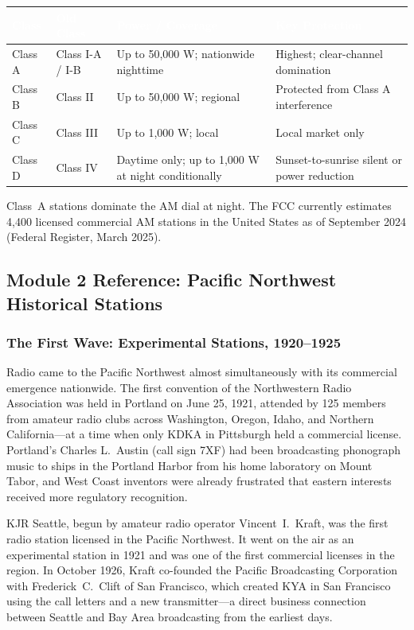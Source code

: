 \documentclass[11pt,letterpaper]{article}
\newcommand{\tableheader}[1]{\textbf{\sffamily\textcolor{white}{#1}}}
\begin{document}
\begin{asciibox}
\begin{center}
\begin{tabularx}{\textwidth}{L{2cm}L{3cm}XL{3.5cm}}
\toprule
{}
\tableheader{Class} & \tableheader{Old Class} & \tableheader{Power / Coverage} & \tableheader{Key Protection} \\
\midrule
Class A & Class I-A / I-B & Up to 50,000 W; nationwide nighttime & Highest; clear-channel domination \\
Class B & Class II & Up to 50,000 W; regional & Protected from Class A interference \\
Class C & Class III & Up to 1,000 W; local & Local market only \\
Class D & Class IV & Daytime only; up to 1,000 W at night conditionally & Sunset-to-sunrise silent or power reduction \\
\bottomrule
\end{tabularx}
\end{center}

Class~A stations dominate the AM dial at night. The FCC currently estimates 4,400 licensed
commercial AM stations in the United States as of September 2024 (Federal Register, March 2025).

\subsection{Module 2 Reference: Pacific Northwest Historical Stations}

\subsubsection{The First Wave: Experimental Stations, 1920--1925}

Radio came to the Pacific Northwest almost simultaneously with its commercial emergence nationwide.
The first convention of the Northwestern Radio Association was held in Portland on June 25, 1921,
attended by 125 members from amateur radio clubs across Washington, Oregon, Idaho, and Northern
California---at a time when only KDKA in Pittsburgh held a commercial license. Portland's Charles
L.~Austin (call sign 7XF) had been broadcasting phonograph music to ships in the Portland Harbor
from his home laboratory on Mount Tabor, and West Coast inventors were already frustrated that
eastern interests received more regulatory recognition.

KJR Seattle, begun by amateur radio operator Vincent~I.~Kraft, was the first radio station
licensed in the Pacific Northwest. It went on the air as an experimental station in 1921 and was
one of the first commercial licenses in the region. In October 1926, Kraft co-founded the Pacific
Broadcasting Corporation with Frederick~C.~Clift of San Francisco, which created KYA in San
Francisco using the call letters and a new transmitter---a direct business connection between
Seattle and Bay Area broadcasting from the earliest days.


\end{asciibox}
\end{document}
